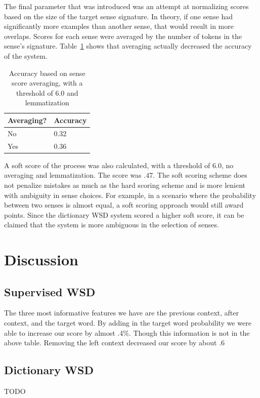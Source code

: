 \documentclass[11pt]{article}
\begin{document}
The final parameter that was introduced was an attempt at normalizing scores based on the size of the target sense signature. In theory, if one sense had significantly more examples than another sense, that would result in more overlaps. Scores for each sense were averaged by the number of tokens in the sense's signature. Table~\ref{averaging} shows that averaging actually decreased the accuracy of the system.

\begin{table}[ht]
    \centering
    \begin{tabular}{|l|l|}
    \hline
    Averaging?                          & Accuracy   \\ \hline
    No & 0.32 \\
    Yes        & 0.36 \\ \hline
    \end{tabular}
\caption{Accuracy based on sense score averaging, with a threshold of 6.0 and lemmatization}
\label{averaging}
\end{table}

A soft score of the process was also calculated, with a threshold of 6.0, no averaging and lemmatization. The score was $.47$. The soft scoring scheme does not penalize mistakes as much as the hard scoring scheme and is more lenient with ambiguity in sense choices. For example, in a scenario where the probability between two senses is almost equal, a soft scoring approach would still award points. Since the dictionary WSD system scored a higher soft score, it can be claimed that the system is more ambiguous in the selection of senses.

\section{Discussion}
\subsection{Supervised WSD}
The three most informative features we have are the previous context, after context, and the target word. By adding in the target word probability we were able to increase our score by almost .4\%. Though this information is not in the above table. Removing the left context decreased our score by about .6%

\subsection{Dictionary WSD}
TODO
\end{document}
